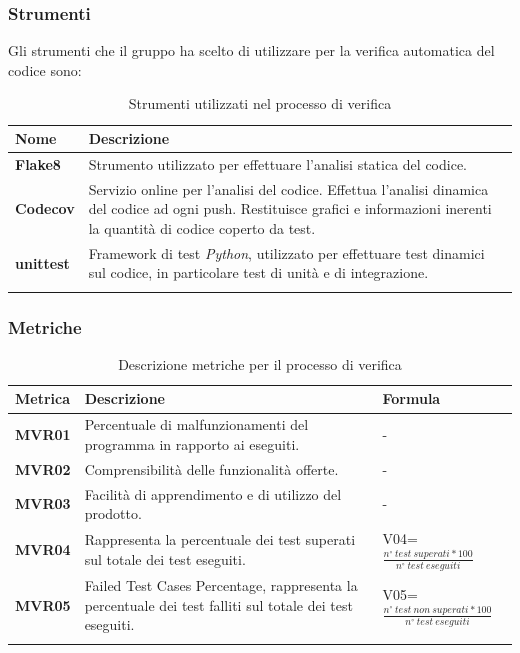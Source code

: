 {{\subsubsection{Strumenti}
Gli strumenti che il gruppo ha scelto di utilizzare per la verifica automatica del codice sono:

\setlength{\freewidth}{\dimexpr\textwidth-0\tabcolsep}
	\renewcommand{\arraystretch}{1.5}
	\setlength{\aboverulesep}{0pt}
	\setlength{\belowrulesep}{0pt}
	\begin{longtable}{L{.15\freewidth} L{.75\freewidth}}
		\textbf{Nome} & \textbf{Descrizione} \\
		\toprule
		\endhead
		\textbf{Flake8} & Strumento utilizzato per effettuare l'analisi statica del codice. \\
		\textbf{Codecov} & Servizio online per l'analisi del codice. Effettua l'analisi dinamica del codice ad ogni push. Restituisce grafici e informazioni inerenti la quantità di codice coperto da test. \\
		\textbf{unittest} & Framework di test \textit{Python}, utilizzato per effettuare test dinamici sul codice, in particolare test di unità e di integrazione. \\
		\bottomrule
		\hiderowcolors
		\caption{Strumenti utilizzati nel processo di verifica}
	\end{longtable}


\subsubsection{Metriche}

\setlength{\freewidth}{\dimexpr\textwidth-0\tabcolsep}
	\renewcommand{\arraystretch}{1}
	\setlength{\aboverulesep}{0pt}
	\setlength{\belowrulesep}{0pt}
	\begin{longtable}{L{.10\freewidth} L{.5\freewidth} L{.280\freewidth}}
		\textbf{Metrica} & \textbf{Descrizione} & \textbf{Formula} \\
		\toprule
		\endhead
				\textbf{MVR01} & Percentuale di malfunzionamenti del programma in rapporto ai  eseguiti. & - \\
				\textbf{MVR02} & Comprensibilità delle funzionalità offerte. & - \\
				\textbf{MVR03} & Facilità di apprendimento e di utilizzo del prodotto. &-  \\
				\textbf{MVR04} & Rappresenta la percentuale dei test superati sul totale dei test eseguiti. &  \small{V04=$\frac{n^\circ\  test\ superati*100}{n^\circ\  test\ eseguiti}$} \\
				\textbf{MVR05} & Failed Test Cases Percentage, rappresenta la percentuale dei test falliti sul totale dei test eseguiti. & \small{V05=$\frac{n^\circ\  test\ non\ superati*100}{n^\circ\  test\ eseguiti}$}\\
		\bottomrule
		\hiderowcolors
		\caption{Descrizione metriche per il processo di verifica}
	\end{longtable}


}}
